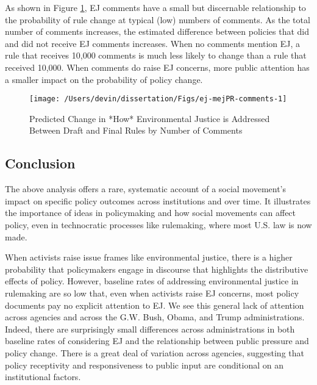 \documentclass[
      12pt,
        ]{article}
\begin{document}
As shown in Figure \ref{fig:ej-mejPR-comments}, EJ comments have a small but discernable relationship to the probability of rule change at typical (low) numbers of comments. As the total number of comments increases, the estimated difference between policies that did and did not receive EJ comments increases. When no comments mention EJ, a rule that receives 10,000 comments is much less likely to change than a rule that received 10,000. When comments do raise EJ concerns, more public attention has a smaller impact on the probability of policy change.

\begin{figure}

{\centering \texttt{[image: /Users/devin/dissertation/Figs/ej-mejPR-comments-1]} 

}

\caption{Predicted Change in *How* Environmental Justice is Addressed Between Draft and Final Rules by Number of Comments}\label{fig:ej-mejPR-comments}
\end{figure}

\hypertarget{conclusion}{%
\subsection{Conclusion}\label{conclusion}}

The above analysis offers a rare, systematic account of a social movement's impact on specific policy outcomes across institutions and over time. It illustrates the importance of ideas in policymaking and how social movements can affect policy, even in technocratic processes like rulemaking, where most U.S. law is now made.

When activists raise issue frames
like environmental justice, there is a higher probability that
policymakers engage in discourse that highlights the distributive effects of policy. However, baseline rates of addressing environmental justice in rulemaking are so low that, even when activists raise EJ concerns, most policy documents pay no explicit attention to EJ. We see this general lack of attention across agencies and across the G.W. Bush, Obama, and Trump administrations. Indeed, there are surprisingly small differences across administrations in both baseline rates of considering EJ and the relationship between public pressure and policy change.
There is a great deal of variation across agencies, suggesting that policy receptivity and responsiveness to public input are conditional on an
institutional factors.
\end{document}
